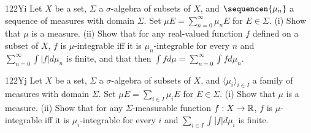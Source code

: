 {\spheader 122Yi Let $X$ be a set, $\Sigma$ a $\sigma$-algebra of
subsets
of $X$, and $\sequencen{\mu_n}$ a sequence of measures with domain
$\Sigma$.   Set $\mu E=\sum_{n=0}^{\infty}\mu_nE$ for $E\in\Sigma$.
(i) Show that $\mu$ is a measure.
(ii) Show that for any real-valued function $f$ defined on a subset of $X$,
$f$ is $\mu$-integrable iff it is $\mu_n$-integrable for every $n$ and
$\sum_{n=0}^{\infty}\int|f|d\mu_n$ is finite, and that then
$\int fd\mu=\sum_{n=0}^{\infty}\int fd\mu_n$.

\spheader 122Yj Let $X$ be a set, $\Sigma$ a $\sigma$-algebra of
subsets
of $X$, and $\langle\mu_i\rangle_{i\in I}$ a family of measures with
domain $\Sigma$.
Set $\mu E=\sum_{i\in I}\mu_iE$ for $E\in\Sigma$.
(i) Show that $\mu$ is a measure.
(ii) Show that for any $\Sigma$-measurable function $f:X\to\Bbb R$,
$f$ is $\mu$-integrable iff it is $\mu_i$-integrable for every $i$ and
$\sum_{i\in I}\int|f|d\mu_i$ is finite.
}%

